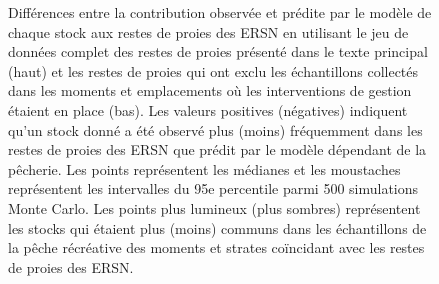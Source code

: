 \begin{figure}[H]
    \centering
    \caption{Différences entre la contribution observée et prédite par le modèle de chaque stock aux restes de proies des ERSN en utilisant le jeu de données complet des restes de proies présenté dans le texte principal (haut) et les restes de proies qui ont exclu les échantillons collectés dans les moments et emplacements où les interventions de gestion étaient en place (bas). Les valeurs positives (négatives) indiquent qu'un stock donné a été observé plus (moins) fréquemment dans les restes de proies des ERSN que prédit par le modèle dépendant de la pêcherie. Les points représentent les médianes et les moustaches représentent les intervalles du 95e percentile parmi 500 simulations Monte Carlo. Les points plus lumineux (plus sombres) représentent les stocks qui étaient plus (moins) communs dans les échantillons de la pêche récréative des moments et strates coïncidant avec les restes de proies des ERSN.}
    \label{fig:comb-sel-stock2}
\end{figure}

